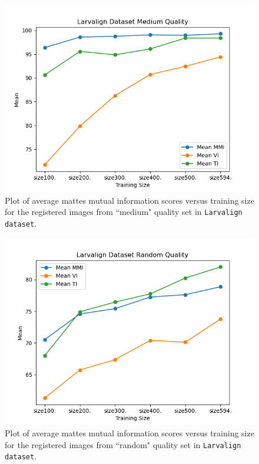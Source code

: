 \documentclass{book}
\begin{document}
	\begin{figure}[h!]
		\centering
		\includegraphics[width=0.9\columnwidth]{resources/ablation_size/size_effect_medium.png}
		\caption{Plot of average mattes mutual information scores versus training size for the registered images from ``medium" quality set in \texttt{Larvalign dataset}.}
		\label{fig:size_effect_medium}
	\end{figure}

	\begin{figure}[h!]
		\centering
		\includegraphics[width=0.9\columnwidth]{resources/ablation_size/size_effect_random.png}
		\caption{Plot of average mattes mutual information scores versus training size for the registered images from ``random" quality set in \texttt{Larvalign dataset}.}
		\label{fig:size_effect_random}
	\end{figure}
	
\end{document}
